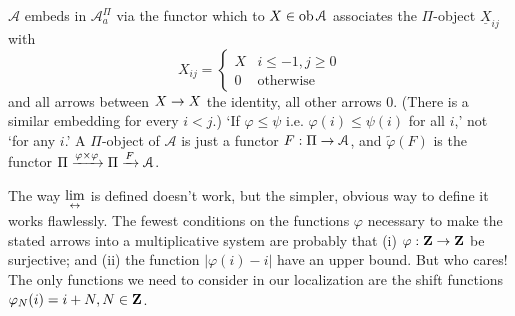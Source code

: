 \documentclass[deligne.tex]{subfiles}
\begin{document}
$\mathcal A$ embeds in $\mathcal A^\Pi_a$ via the functor which to
$X\in\operatorname{ob} \mathcal A$ associates the $\Pi$-object $\underline X_{ij}$ with
\begin{equation*}
	X_{ij}=\begin{cases} X&i\leq-1,j\geq0 \\ 0&\text{otherwise} \end{cases}
\end{equation*}
and all arrows between $X\rightarrow X$ the identity, all other arrows 0.
(There is a similar embedding for every $i<j$.)
`If $\varphi\leq\psi$ i.e. $\varphi(i)\leq\psi(i)$ for all $i$,' not `for
any $i$.' A $\Pi$-object of $\mathcal A$ is just a functor
$F:\Pi\rightarrow \mathcal A$, and $\tilde\varphi(F)$ is the functor
$\Pi\xrightarrow{\varphi\times\varphi}\Pi\xrightarrow F \mathcal A$.

The way $\displaystyle\lim_{\leftrightarrow}$ is defined doesn't work, but the simpler, obvious way to
define it works flawlessly. The fewest conditions on the functions $\varphi$
necessary to make the stated arrows into a multiplicative system are 
probably that (i) $\varphi:\mathbf{Z}\rightarrow\mathbf{Z}$ be surjective; and
(ii) the function $|\varphi(i)-i|$ have an upper bound.
But who cares! The only functions we need to consider in our localization
are the shift functions $\varphi_N(i)=i+N,N\in\mathbf{Z}$.
\end{document}
